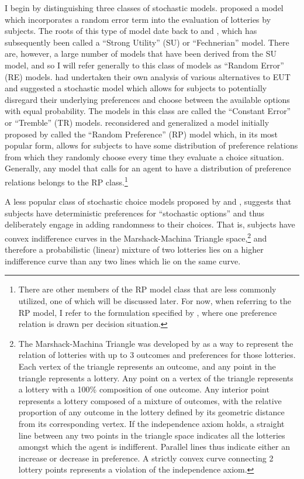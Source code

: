 \documentclass[../main.tex]{subfiles}
\begin{document}
I begin by distinguishing three classes of stochastic models.
\textcite[1301]{Hey1994} proposed a model which incorporates a random error term into the evaluation of lotteries by subjects.
The roots of this type of model date back to \textcite{Fechner1966} and \textcite{Luce1959}, which has subsequently been called a \enquote{Strong Utility} (SU) or \enquote{Fechnerian} model.
There are, however, a large number of models that have been derived from the SU model, and so I will refer generally to this class of models as \enquote{Random Error} (RE) models.
\textcite{Harless1994} had undertaken their own analysis of various alternatives to EUT and suggested a stochastic model which allows for subjects to potentially disregard their underlying preferences and choose between the available options with equal probability.
The models in this class are called the \enquote{Constant Error} or \enquote{Tremble} (TR) models.
\textcite{Loomes1995} reconsidered and generalized a model initially proposed by \textcite{Becker1963} called the \enquote{Random Preference} (RP) model which, in its most popular form, allows for subjects to have some distribution of preference relations from which they randomly choose every time they evaluate a choice situation.
Generally, any model that calls for an agent to have a distribution of preference relations belongs to the RP class.\footnote{
	There are other members of the RP model class that are less commonly utilized, one of which will be discussed later.
	For now, when referring to the RP model, I refer to the formulation specified by \textcite{Loomes1995}, where one preference relation is drawn per decision situation.}

A less popular class of stochastic choice models proposed by \textcite{Machina1985} and \textcite{Chew1991}, suggests that subjects have deterministic preferences for \enquote{stochastic options} and thus deliberately engage in adding randomness to their choices.
That is, subjects have convex indifference curves in the Marshack-Machina Triangle space,\footnote{
	The Marshack-Machina Triangle was developed by \textcite{Machina1987} as a way to represent the relation of lotteries with up to 3 outcomes and preferences for those lotteries.
	Each vertex of the triangle represents an outcome, and any point in the triangle represents a lottery.
	Any point on a vertex of the triangle represents a lottery with a 100\% composition of one outcome.
	Any interior point represents a lottery composed of a mixture of outcomes, with the relative proportion of any outcome in the lottery defined by its geometric distance from its corresponding vertex.
	If the independence axiom holds, a straight line between any two points in the triangle space indicates all the lotteries amongst which the agent is indifferent.
	Parallel lines thus indicate either an increase or decrease in preference.
	A strictly convex curve connecting 2 lottery points represents a violation of the independence axiom.} and therefore a probabilistic (linear) mixture of two lotteries lies on a higher indifference curve than any two lines which lie on the same curve.
\end{document}
